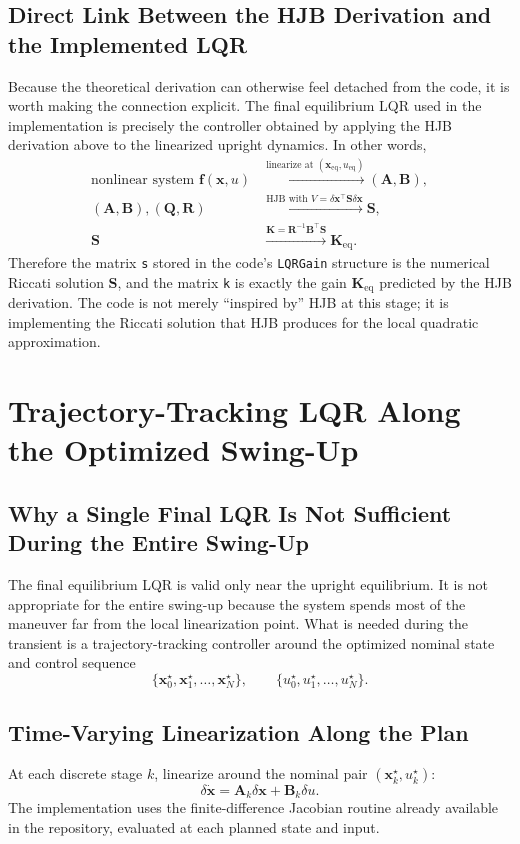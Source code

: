 \documentclass[conference]{IEEEtran}
\begin{document}
\subsection{Direct Link Between the HJB Derivation and the Implemented LQR}
Because the theoretical derivation can otherwise feel detached from the code, it is worth making the connection explicit. The final equilibrium LQR used in the implementation is precisely the controller obtained by applying the HJB derivation above to the linearized upright dynamics. In other words,
\begin{align}
\text{nonlinear system } \bm{f}(\bm{x},u)
&\xrightarrow{\text{linearize at }(\bm{x}_{\mathrm{eq}},u_{\mathrm{eq}})}
(\bm{A},\bm{B}),
\\
(\bm{A},\bm{B}),(\bm{Q},\bm{R})
&\xrightarrow{\text{HJB with }V=\delta\bm{x}^{\top}\bm{S}\delta\bm{x}}
\bm{S},
\\
\bm{S}
&\xrightarrow{\bm{K}=\bm{R}^{-1}\bm{B}^{\top}\bm{S}}
\bm{K}_{\mathrm{eq}}.
\end{align}
Therefore the matrix \texttt{s} stored in the code's \texttt{LQRGain} structure is the numerical Riccati solution $\bm{S}$, and the matrix \texttt{k} is exactly the gain $\bm{K}_{\mathrm{eq}}$ predicted by the HJB derivation. The code is not merely ``inspired by'' HJB at this stage; it is implementing the Riccati solution that HJB produces for the local quadratic approximation.

\section{Trajectory-Tracking LQR Along the Optimized Swing-Up}
\subsection{Why a Single Final LQR Is Not Sufficient During the Entire Swing-Up}
The final equilibrium LQR is valid only near the upright equilibrium. It is not appropriate for the entire swing-up because the system spends most of the maneuver far from the local linearization point. What is needed during the transient is a trajectory-tracking controller around the optimized nominal state and control sequence
\begin{equation}
\{\bm{x}_0^{\star},\bm{x}_1^{\star},\ldots,\bm{x}_N^{\star}\},
\qquad
\{u_0^{\star},u_1^{\star},\ldots,u_N^{\star}\}.
\end{equation}

\subsection{Time-Varying Linearization Along the Plan}
At each discrete stage $k$, linearize around the nominal pair $(\bm{x}_k^{\star},u_k^{\star})$:
\begin{equation}
\delta \dot{\bm{x}} = \bm{A}_k \delta\bm{x} + \bm{B}_k \delta u.
\end{equation}
The implementation uses the finite-difference Jacobian routine already available in the repository, evaluated at each planned state and input.
\end{document}
